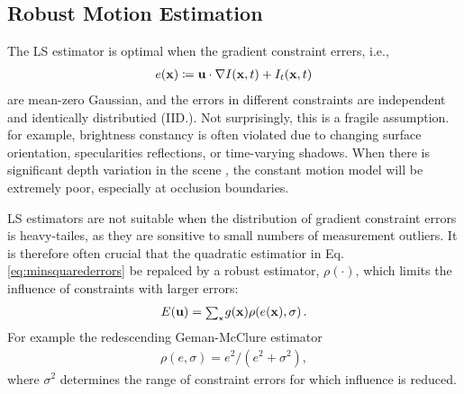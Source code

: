 \begin{compactdesc}
\section{Robust Motion Estimation}
The LS estimator is optimal when the gradient constraint errers, i.e.,
\begin{gather*}
	e(\bm{\mathrm{x}})\coloneqq \bm{\mathrm{u}}\cdot \nabla I(\bm{\mathrm{x}},t)+I_t(\bm{\mathrm{x}},t)
\end{gather*}
are mean-zero Gaussian, and the errors in different constraints are independent and identically distributied (IID.). Not surprisingly, this is a fragile assumption. for example, brightness constancy is often violated due to changing surface orientation, specularities reflections, or time-varying shadows. When there is significant depth variation in the scene , the constant motion model will be extremely poor, especially at occlusion boundaries.

LS estimators are not suitable when the distribution of gradient constraint errors is heavy-tailes, as they are sonsitive to small numbers of measurement outliers. It is therefore often crucial that the quadratic estimatior in Eq. \ref{eq:minsquarederrors} be repalced by a robust estimator, $\rho(\cdot)$, which limits the influence of constraints with larger errors:
\begin{gather*}
	E(\bm{\mathrm{u}})={\scriptstyle\sum_{\bm{\mathrm{x}}}}^{}g(\bm{\mathrm{x}})\rho\!\left( e(\bm{\mathrm{x}}),\sigma \right).
\end{gather*}
For example the redescending Geman-McClure estimator
\begin{gather*}
	\rho(e,\sigma)=e^2/\left( e^2+\sigma^2 \right),
\end{gather*}
where $\sigma^2$ determines the range of constraint errors for which influence is reduced.

\end{compactdesc}
